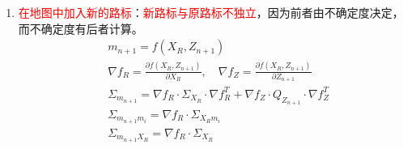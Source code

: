 \documentclass[
12pt, %
a4paper, 
oneside, %
]{scrartcl}
\begin{document}
\begin{enumerate}
转换得到：
$$ \delta = \begin{pmatrix} \delta_x \\ \delta_y \end{pmatrix} = \begin{pmatrix} \bar{x}_m - \bar{x}_R \\ \bar{y}_m - \bar{y}_R \end{pmatrix}, \quad q = \delta^T \delta, \quad \hat{z}_t^i = \begin{pmatrix} \sqrt{q} \\ atan2(\delta_y, \delta_x) - \bar{\theta}_R \end{pmatrix} $$

有单路标雅可比：
\begin{align*} H_i^j &= {}^{low} H_i^j F_{x, j} \\ &= \frac{1}{q} \begin{pmatrix} -\sqrt{q}\delta_x & -\sqrt{q}\delta_y & 0 & \sqrt{q}\delta_x & \sqrt{q}\delta_y \\ \delta_y & -\delta_x & -q & -\delta_y & \delta_x \end{pmatrix} \begin{pmatrix} I_3 & 0_{2j - 2} & 0 & 0_{2N - 2j} \\ 0 & 0 & I_2 & 0 \\ \end{pmatrix} \end{align*}
\item \textcolor{red}{在地图中加入新的路标}：\textcolor{red}{新路标与原路标不独立}，因为前者由不确定度决定，而不确定度有后者计算。
\begin{align*}
&m_{n + 1} = f(X_R, Z_{n + 1}) \\
&\nabla f_R = \frac{\partial f(X_R, Z_{n + 1})}{\partial X_R}, \quad \nabla f_Z = \frac{\partial f(X_R, Z_{n + 1})}{\partial Z_{n + 1}} \\
&\Sigma_{m_{n + 1}} = \nabla f_R \cdot \Sigma_{X_R} \cdot \nabla f_R^T + \nabla f_Z \cdot Q_{Z_{n + 1}} \cdot \nabla f_Z^T \\\
&\Sigma_{m_{n + 1}m_i} = \nabla f_R \cdot \Sigma_{X_R m_i} \\
&\Sigma_{m_{n + 1}X_R} = \nabla f_R \cdot \Sigma_{X_R}
\end{align*}


\end{enumerate}
\end{document}
